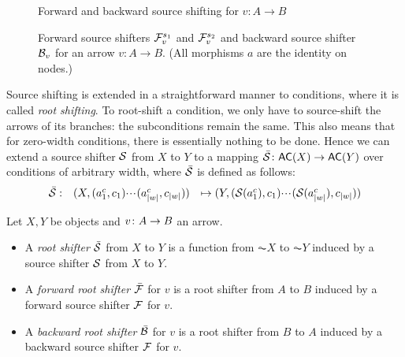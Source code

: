 \begin{figure}[t]
\centering

\caption{Forward and backward source shifting for $v:A\to B$}
\end{figure}

\begin{figure}
\centering

\caption{Forward source shifters $\mathcal{F}_v^{s_1}$ and $\mathcal{F}_v^{s_2}$ and backward source shifter $\mathcal{B}_v$ for an arrow $v:A\to B$. (All morphisms $a$ are the identity on nodes.)}
\end{figure}

Source shifting is extended in a straightforward manner to conditions, where it is called \emph{root shifting}. To root-shift a condition, we only have to source-shift the arrows of its branches: the subconditions remain the same. This also means that for zero-width conditions, there is essentially nothing to be done. Hence we can extend a source shifter $\mathcal{S}$ from $X$ to $Y$ to a mapping $\bar\cS\of \AC X\to \AC Y$ over conditions of arbitrary width,  where $\bar{\mathcal{S}}$ is defined as follows:
\[\begin{array}{rrl}
\bar{\mathcal{S}}: & (X,(a^c_1,c_1){\cdotp\mkern-2mu\cdotp\mkern-2mu\cdotp\mkern1mu} (a^c_{|w|},c_{|w|})) & \mapsto (Y,(\mathcal{S}(a^c_1),c_1){\cdotp\mkern-2mu\cdotp\mkern-2mu\cdotp\mkern1mu} (\mathcal{S}(a^c_{|w|}),c_{|w|}))  
\end{array}\]

\begin{definition}
Let $X,Y$ be objects and $v\colon A\rightarrow B$ an arrow.
\begin{itemize}[topsep=\smallskipamount]
\item A \emph{root shifter} $\bar{\mathcal{S}}$ from $X$ to $Y$ is a function from $\AC X$ to $\AC Y$ induced by a source shifter $\mathcal{S}$ from $X$ to $Y$.

\item A \emph{forward root shifter} $\bar{\mathcal{F}}$ for $v$ is a root shifter from $A$ to $B$ induced by a forward source shifter $\mathcal{F}$ for $v$.

\item A \emph{backward root shifter} $\bar{\mathcal{B}}$ for $v$ is a root shifter from $B$ to $A$  induced by a backward source shifter $\mathcal{F}$ for $v$.

\end{itemize}
\end{definition}
%

